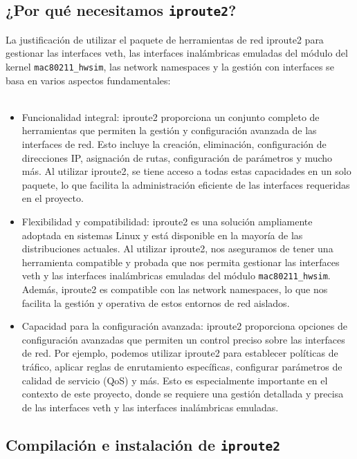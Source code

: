 \subsection{¿Por qué necesitamos \texttt{iproute2}?}

La justificación de utilizar el paquete de herramientas de red iproute2 para gestionar las interfaces veth, las interfaces inalámbricas emuladas del módulo del kernel \texttt{mac80211\_hwsim}, las network namespaces y la gestión con interfaces se basa en varios aspectos fundamentales:\\
\\
\begin{itemize}
    \item Funcionalidad integral: iproute2 proporciona un conjunto completo de herramientas que permiten la gestión y configuración avanzada de las interfaces de red. Esto incluye la creación, eliminación, configuración de direcciones IP, asignación de rutas, configuración de parámetros y mucho más. Al utilizar iproute2, se tiene acceso a todas estas capacidades en un solo paquete, lo que facilita la administración eficiente de las interfaces requeridas en el proyecto.

    \item Flexibilidad y compatibilidad: iproute2 es una solución ampliamente adoptada en sistemas Linux y está disponible en la mayoría de las distribuciones actuales. Al utilizar iproute2, nos aseguramos de tener una herramienta compatible y probada que nos permita gestionar las interfaces veth y las interfaces inalámbricas emuladas del módulo \texttt{mac80211\_hwsim}. Además, iproute2 es compatible con las network namespaces, lo que nos facilita la gestión y operativa de estos entornos de red aislados.

    \item Capacidad para la configuración avanzada: iproute2 proporciona opciones de configuración avanzadas que permiten un control preciso sobre las interfaces de red. Por ejemplo, podemos utilizar iproute2 para establecer políticas de tráfico, aplicar reglas de enrutamiento específicas, configurar parámetros de calidad de servicio (QoS) y más. Esto es especialmente importante en el contexto de este proyecto, donde se requiere una gestión detallada y precisa de las interfaces veth y las interfaces inalámbricas emuladas.
\end{itemize}


\subsection{Compilación e instalación de \texttt{iproute2}}


